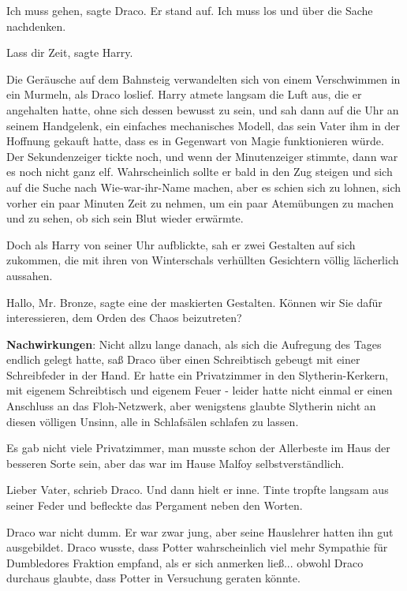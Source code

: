 \glqq Ich muss gehen\grqq{}, sagte Draco. Er stand auf. \glqq Ich muss los und
über die Sache nachdenken.\grqq{}

\glqq Lass dir Zeit\grqq{}, sagte Harry.

Die Geräusche auf dem Bahnsteig verwandelten sich von einem Verschwimmen in ein
Murmeln, als Draco loslief. Harry atmete langsam die Luft aus, die er angehalten
hatte, ohne sich dessen bewusst zu sein, und sah dann auf die Uhr an seinem
Handgelenk, ein einfaches mechanisches Modell, das sein Vater ihm in der
Hoffnung gekauft hatte, dass es in Gegenwart von Magie funktionieren würde. Der
Sekundenzeiger tickte noch, und wenn der Minutenzeiger stimmte, dann war es noch
nicht ganz elf. Wahrscheinlich sollte er bald in den Zug steigen und sich auf
die Suche nach Wie-war-ihr-Name machen, aber es schien sich zu lohnen, sich
vorher ein paar Minuten Zeit zu nehmen, um ein paar Atemübungen zu machen und zu
sehen, ob sich sein Blut wieder erwärmte.

Doch als Harry von seiner Uhr aufblickte, sah er zwei Gestalten auf sich
zukommen, die mit ihren von Winterschals verhüllten Gesichtern völlig lächerlich
aussahen.

\glqq Hallo, Mr. Bronze\grqq{}, sagte eine der maskierten Gestalten. \glqq
Können wir Sie dafür interessieren, dem Orden des Chaos beizutreten?\grqq{}

\textbf{Nachwirkungen}: Nicht allzu lange danach, als sich die Aufregung des
Tages endlich gelegt hatte, saß Draco über einen Schreibtisch gebeugt mit einer
Schreibfeder in der Hand. Er hatte ein Privatzimmer in den Slytherin-Kerkern,
mit eigenem Schreibtisch und eigenem Feuer - leider hatte nicht einmal er einen
Anschluss an das Floh-Netzwerk, aber wenigstens glaubte Slytherin nicht an
diesen völligen Unsinn, alle in Schlafsälen schlafen zu lassen.

Es gab nicht viele Privatzimmer, man musste schon der Allerbeste im Haus der
besseren Sorte sein, aber das war im Hause Malfoy selbstverständlich.

Lieber Vater, schrieb Draco. Und dann hielt er inne. Tinte tropfte langsam aus
seiner Feder und befleckte das Pergament neben den Worten.

Draco war nicht dumm. Er war zwar jung, aber seine Hauslehrer hatten ihn gut
ausgebildet. Draco wusste, dass Potter wahrscheinlich viel mehr Sympathie für
Dumbledores Fraktion empfand, als er sich anmerken ließ... obwohl Draco durchaus
glaubte, dass Potter in Versuchung geraten könnte.


